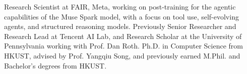 

\begin{cvparagraph}

Research Scientist at FAIR, Meta, working on post-training for the agentic capabilities of the Muse Spark model, with a focus on tool use, self-evolving agents, and structured reasoning models. Previously Senior Researcher and Research Lead at Tencent AI Lab, and Research Scholar at the University of Pennsylvania working with Prof. Dan Roth. Ph.D. in Computer Science from HKUST, advised by Prof. Yangqiu Song, and previously earned M.Phil. and Bachelor's degrees from HKUST.
\end{cvparagraph}

